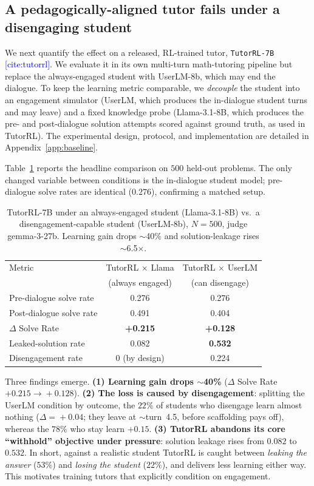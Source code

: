 \documentclass[11pt]{article}
\newcommand{\cit}[1]{\textcolor{blue}{[\textsf{cite:#1}]}}
\begin{document}
\subsection{A pedagogically-aligned tutor fails under a disengaging student}
\label{sec:motivation-tutorrl}

We next quantify the effect on a released, RL-trained tutor, \texttt{TutorRL-7B} \cit{tutorrl}. 
We evaluate it in its own multi-turn math-tutoring pipeline but replace the always-engaged student with UserLM-8b, which may end the dialogue. 
To keep the learning metric comparable, we \emph{decouple} the student into an engagement simulator (UserLM, which produces the in-dialogue student turns and may leave) and a fixed knowledge probe (Llama-3.1-8B, which produces the pre- and post-dialogue solution attempts scored against ground truth, as used in TutorRL). 
The experimental design, protocol, and implementation are detailed in Appendix~\ref{app:baseline}.

Table~\ref{tab:baseline} reports the headline comparison on $500$ held-out
problems. The only changed variable between conditions is the in-dialogue student
model; pre-dialogue solve rates are identical ($0.276$), confirming a matched
setup.

\begin{table}[h]
\centering
\small
\begin{tabular}{lcc}
\toprule
Metric & TutorRL $\times$ Llama & TutorRL $\times$ UserLM \\
       & (always engaged) & (can disengage) \\
\midrule
Pre-dialogue solve rate   & 0.276  & 0.276 \\
Post-dialogue solve rate  & 0.491  & 0.404 \\
$\Delta$ Solve Rate       & \textbf{+0.215} & \textbf{+0.128} \\
Leaked-solution rate      & 0.082  & \textbf{0.532} \\
Disengagement rate        & 0 (by design) & 0.224 \\
\bottomrule
\end{tabular}
\caption{TutorRL-7B under an always-engaged student (Llama-3.1-8B) vs.\ a
disengagement-capable student (UserLM-8b), $N{=}500$, judge gemma-3-27b.
Learning gain drops $\sim$40\% and solution-leakage rises $\sim$6.5$\times$.}
\label{tab:baseline}
\end{table}

Three findings emerge. \textbf{(1) Learning gain drops $\sim$40\%}
($\Delta$ Solve Rate $+0.215\!\rightarrow\!+0.128$). \textbf{(2) The loss is
caused by disengagement}: splitting the UserLM condition by outcome, the $22\%$
of students who disengage learn almost nothing ($\Delta\!=\!+0.04$; they leave at
$\sim$turn~4.5, before scaffolding pays off), whereas the $78\%$ who stay learn
$+0.15$. \textbf{(3) TutorRL abandons its core ``withhold'' objective under
pressure}: solution leakage rises from $0.082$ to $0.532$. In short, against a
realistic student TutorRL is caught between \emph{leaking the answer} ($53\%$) and
\emph{losing the student} ($22\%$), and delivers less learning either way. This
motivates training tutors that explicitly condition on engagement.
\end{document}
